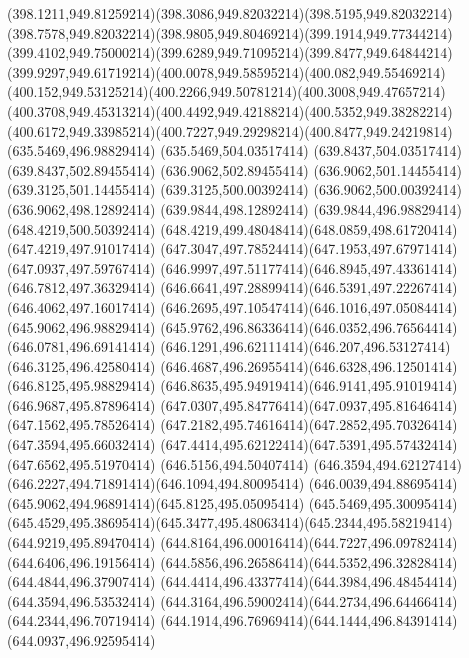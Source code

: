 {{	\curveto(398.1211,949.81259214)(398.3086,949.82032214)(398.5195,949.82032214)
	\curveto(398.7578,949.82032214)(398.9805,949.80469214)(399.1914,949.77344214)
	\curveto(399.4102,949.75000214)(399.6289,949.71095214)(399.8477,949.64844214)
	\curveto(399.9297,949.61719214)(400.0078,949.58595214)(400.082,949.55469214)
	\curveto(400.152,949.53125214)(400.2266,949.50781214)(400.3008,949.47657214)
	\curveto(400.3708,949.45313214)(400.4492,949.42188214)(400.5352,949.38282214)
	\curveto(400.6172,949.33985214)(400.7227,949.29298214)(400.8477,949.24219814)
	\closepath
	\moveto(635.5469,496.98829414)
	\lineto(635.5469,504.03517414)
	\lineto(639.8437,504.03517414)
	\lineto(639.8437,502.89455414)
	\lineto(636.9062,502.89455414)
	\lineto(636.9062,501.14455414)
	\lineto(639.3125,501.14455414)
	\lineto(639.3125,500.00392414)
	\lineto(636.9062,500.00392414)
	\lineto(636.9062,498.12892414)
	\lineto(639.9844,498.12892414)
	\lineto(639.9844,496.98829414)
	\closepath
	\moveto(648.4219,500.50392414)
	\curveto(648.4219,499.48048414)(648.0859,498.61720414)(647.4219,497.91017414)
	\curveto(647.3047,497.78524414)(647.1953,497.67971414)(647.0937,497.59767414)
	\curveto(646.9997,497.51177414)(646.8945,497.43361414)(646.7812,497.36329414)
	\curveto(646.6641,497.28899414)(646.5391,497.22267414)(646.4062,497.16017414)
	\curveto(646.2695,497.10547414)(646.1016,497.05084414)(645.9062,496.98829414)
	\curveto(645.9762,496.86336414)(646.0352,496.76564414)(646.0781,496.69141414)
	\curveto(646.1291,496.62111414)(646.207,496.53127414)(646.3125,496.42580414)
	\curveto(646.4687,496.26955414)(646.6328,496.12501414)(646.8125,495.98829414)
	\curveto(646.8635,495.94919414)(646.9141,495.91019414)(646.9687,495.87896414)
	\curveto(647.0307,495.84776414)(647.0937,495.81646414)(647.1562,495.78526414)
	\curveto(647.2182,495.74616414)(647.2852,495.70326414)(647.3594,495.66032414)
	\curveto(647.4414,495.62122414)(647.5391,495.57432414)(647.6562,495.51970414)
	\lineto(646.5156,494.50407414)
	\curveto(646.3594,494.62127414)(646.2227,494.71891414)(646.1094,494.80095414)
	\curveto(646.0039,494.88695414)(645.9062,494.96891414)(645.8125,495.05095414)
	\lineto(645.5469,495.30095414)
	\curveto(645.4529,495.38695414)(645.3477,495.48063414)(645.2344,495.58219414)
	\lineto(644.9219,495.89470414)
	\curveto(644.8164,496.00016414)(644.7227,496.09782414)(644.6406,496.19156414)
	\curveto(644.5856,496.26586414)(644.5352,496.32828414)(644.4844,496.37907414)
	\curveto(644.4414,496.43377414)(644.3984,496.48454414)(644.3594,496.53532414)
	\curveto(644.3164,496.59002414)(644.2734,496.64466414)(644.2344,496.70719414)
	\curveto(644.1914,496.76969414)(644.1444,496.84391414)(644.0937,496.92595414)
}}
